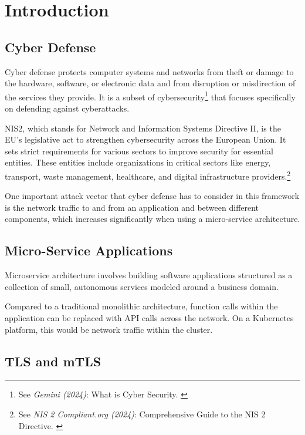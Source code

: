 %
%

\pagebreak
\section{Introduction}

\onehalfspacing

\subsection{Cyber Defense}

Cyber defense protects computer systems and networks from theft or damage to the hardware, software, or electronic data and from disruption or misdirection of the services they provide. It is a subset of cybersecurity\footnote{See \textit{Gemini (2024)}: What is Cyber Security. \cite{bardCybersec}} that focuses specifically on defending against cyberattacks.

NIS2, which stands for Network and Information Systems Directive II, is the EU's legislative act to strengthen cybersecurity across the European Union. It sets strict requirements for various sectors to improve security for essential entities. These entities include organizations in critical sectors like energy, transport, waste management, healthcare, and digital infrastructure providers.\footnote{See \textit{NIS 2 Compliant.org (2024)}: Comprehensive Guide to the NIS 2 Directive. \cite{nisGuide}}

One important attack vector that cyber defense has to consider in this framework is the network traffic to and from an application and between different components, which increases significantly when using a micro-service architecture.

\subsection{Micro-Service Applications}

Microservice architecture involves building software applications structured as a collection of small, autonomous services modeled around a business domain.

Compared to a traditional monolithic architecture, function calls within the application can be replaced with API calls across the network. On a Kubernetes platform, this would be network traffic within the cluster.

\subsection{TLS and mTLS}

